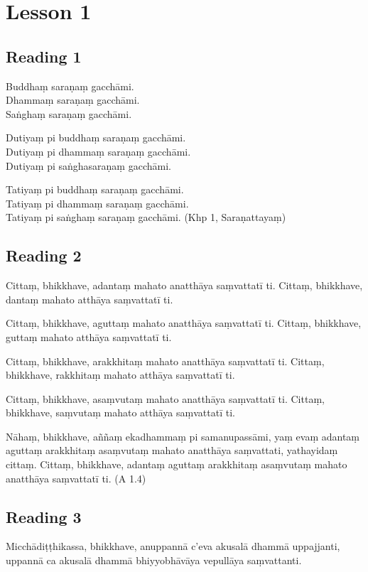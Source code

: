\chapter{Lesson 1}

\section*{Reading 1}

Buddhaṃ saraṇaṃ gacchāmi.\\
Dhammaṃ saraṇaṃ gacchāmi.\\
Saṅghaṃ saraṇaṃ gacchāmi.

Dutiyaṃ pi buddhaṃ saraṇaṃ gacchāmi.\\
Dutiyaṃ pi dhammaṃ saraṇaṃ gacchāmi.\\
Dutiyaṃ pi saṅghasaraṇaṃ gacchāmi.

Tatiyaṃ pi buddhaṃ saraṇaṃ gacchāmi.\\
Tatiyaṃ pi dhammaṃ saraṇaṃ gacchāmi.\\
Tatiyaṃ pi saṅghaṃ saraṇaṃ gacchāmi. (Khp 1, Saraṇattayaṃ)

\section*{Reading 2}

Cittaṃ, bhikkhave, adantaṃ mahato anatthāya saṃvattatī ti. Cittaṃ, bhikkhave, dantaṃ mahato atthāya saṃvattatī ti.

Cittaṃ, bhikkhave, aguttaṃ mahato anatthāya saṃvattatī ti. Cittaṃ, bhikkhave, guttaṃ mahato atthāya saṃvattatī ti.

Cittaṃ, bhikkhave, arakkhitaṃ mahato anatthāya saṃvattatī ti. Cittaṃ, bhikkhave, rakkhitaṃ mahato atthāya saṃvattatī ti.

Cittaṃ, bhikkhave, asaṃvutaṃ mahato anatthāya saṃvattatī ti. Cittaṃ, bhikkhave, saṃvutaṃ mahato atthāya saṃvattatī ti.

Nāhaṃ, bhikkhave, aññaṃ ekadhammaṃ pi samanupassāmi, yaṃ evaṃ adantaṃ aguttaṃ arakkhitaṃ asaṃvutaṃ mahato anatthāya saṃvattati, yathayidaṃ cittaṃ. Cittaṃ, bhikkhave, adantaṃ aguttaṃ arakkhitaṃ asaṃvutaṃ mahato anatthāya saṃvattatī ti. (A 1.4)

\section*{Reading 3}

Micchādiṭṭhikassa, bhikkhave, anuppannā c’eva akusalā dhammā uppajjanti, uppannā ca akusalā dhammā bhiyyobhāvāya vepullāya saṃvattanti.

